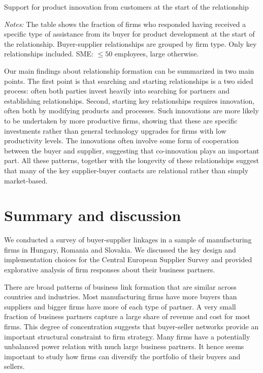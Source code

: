\documentclass[final, dvipsnames, authoryear,12pt]{elsarticle}
\begin{document}
\begin{table}[h]
    \caption{Support for product innovation from customers at the start of the relationship}
    \label{tab:start_support}
    

    {\scriptsize \textit{Notes:} The table shows the fraction of firms who responded having received a specific type of assistance from its buyer for product development at the start of the relationship. Buyer-supplier relationships are grouped by firm type. Only key relationships included. SME: $\le 50$ employees, large otherwise.}
\end{table}

Our main findings about relationship formation can be summarized in two main points. The first point is that searching and starting relationships is a two sided process: often both parties invest heavily into searching for partners and establishing relationships. Second, starting key relationships requires innovation, often both by modifying products and processes. Such innovations are more likely to be undertaken by more productive firms, showing that these are specific investments rather than general technology upgrades for firms with low productivity levels. The innovations often involve some form of cooperation between the buyer and supplier, suggesting that co-innovation plays an important part. All these patterns, together with the longevity of these relationships suggest that many of the key supplier-buyer contacts are relational rather than simply market-based. 

\section{Summary and discussion}
\label{sec:conclusions}
We conducted a survey of buyer-supplier linkages in a sample of manufacturing firms in Hungary, Romania and Slovakia. We discussed the key design and implementation choices for the Central European Supplier Survey and provided explorative analysis of firm responses about their business partners.

There are broad patterns of business link formation that are similar across countries and industries. Most manufacturing firms have more buyers than suppliers and bigger firms have more of each type of partner. A very small fraction of business partners capture a large share of revenue and cost for most firms. This degree of concentration suggests that buyer-seller networks provide an important structural constraint to firm strategy. Many firms have a potentially unbalanced power relation with much large business partners. It hence seems important to study how firms can diversify the portfolio of their buyers and sellers.
\end{document}
